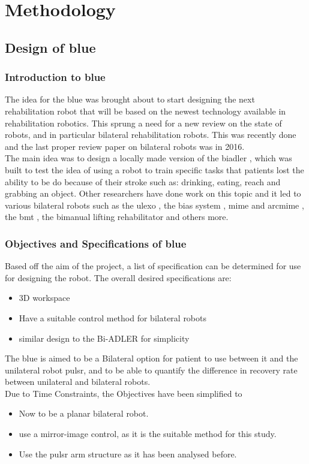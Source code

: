 \chapter{Methodology}\label{Ch:3}
	
\section{Design of \ac{blue}}\label{sec:Introduction3}
\subsection{Introduction to \ac{blue}}
The idea for the \ac{blue} was brought about to start designing the next rehabilitation robot that will be based on the newest technology available in rehabilitation robotics. This sprung a need for a new review on the state of robots, and in particular bilateral rehabilitation robots. This was recently done and the last proper review paper on bilateral robots was in 2016.\\
The main idea was to design a locally made version of the \acf{biadler} \cite{Christopher2014,Johnson2011a,Lott2016}, which was built to test the idea of using a robot to train specific tasks that patients lost the ability to be do because of their stroke such as: drinking, eating, reach and grabbing an object. Other researchers have done work on this topic and it led to various bilateral robots such as the \acf{ulexo} \cite{Perry2007}, the \acf{bias} system \cite{Johnson2011b}, \acf{mime} and \acf{arcmime} \cite{Burgar2011,Lum2002,Lum2005,Mahoney2003}, the \acf{bmt} \cite{Hung2019b}, the bimanual lifting rehabilitator \cite{Lum1995} and others more.

\subsection{Objectives and Specifications of \ac{blue}}
Based off the aim of the project, a list of specification can be determined for use for designing the robot. The overall desired specifications are:
\begin{itemize}%
	\item  3D workspace
	\item Have a suitable control method for bilateral robots
	\item similar design to the Bi-ADLER for simplicity
	\label{item:specs}
\end{itemize}
The \ac{blue} is aimed to be a Bilateral option for patient to use between it and the unilateral robot \ac{pulsr}, and to be able to quantify the difference in recovery rate between unilateral and bilateral robots.\\
Due to Time Constraints, the Objectives have been simplified to 
\begin{itemize}%
	\item Now to be a planar bilateral robot.
	\item use a mirror-image control, as it is the suitable method for this study.
	\item Use the \ac{pulsr} arm structure as it has been analysed before.
\end{itemize}
